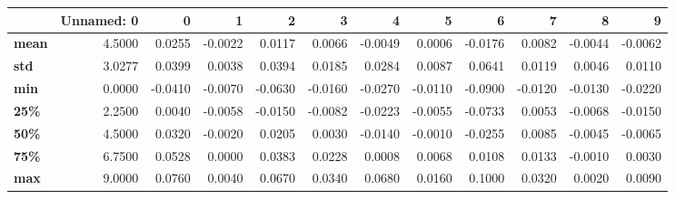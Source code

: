 \begin{tabular}{lrrrrrrrrrrr}
\toprule
{} &  Unnamed: 0 &       0 &       1 &       2 &       3 &       4 &       5 &       6 &       7 &       8 &       9 \\
\midrule
\textbf{mean} &      4.5000 &  0.0255 & -0.0022 &  0.0117 &  0.0066 & -0.0049 &  0.0006 & -0.0176 &  0.0082 & -0.0044 & -0.0062 \\
\textbf{std } &      3.0277 &  0.0399 &  0.0038 &  0.0394 &  0.0185 &  0.0284 &  0.0087 &  0.0641 &  0.0119 &  0.0046 &  0.0110 \\
\textbf{min } &      0.0000 & -0.0410 & -0.0070 & -0.0630 & -0.0160 & -0.0270 & -0.0110 & -0.0900 & -0.0120 & -0.0130 & -0.0220 \\
\textbf{25\% } &      2.2500 &  0.0040 & -0.0058 & -0.0150 & -0.0082 & -0.0223 & -0.0055 & -0.0733 &  0.0053 & -0.0068 & -0.0150 \\
\textbf{50\% } &      4.5000 &  0.0320 & -0.0020 &  0.0205 &  0.0030 & -0.0140 & -0.0010 & -0.0255 &  0.0085 & -0.0045 & -0.0065 \\
\textbf{75\% } &      6.7500 &  0.0528 &  0.0000 &  0.0383 &  0.0228 &  0.0008 &  0.0068 &  0.0108 &  0.0133 & -0.0010 &  0.0030 \\
\textbf{max } &      9.0000 &  0.0760 &  0.0040 &  0.0670 &  0.0340 &  0.0680 &  0.0160 &  0.1000 &  0.0320 &  0.0020 &  0.0090 \\
\bottomrule
\end{tabular}
